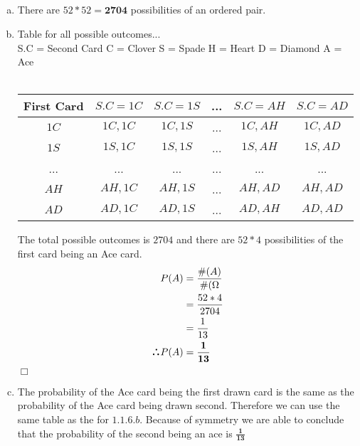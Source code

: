 \documentclass[10pt]{report}
\newenvironment{proof}{\par\noindent{\it Proof.}\hspace*{1em}}{$\Box$\bigskip}
\def\therefore{\boldsymbol{\text{ }
\leavevmode
\lower0.4ex\hbox{$\cdot$}
\kern-.5em\raise0.7ex\hbox{$\cdot$}
\kern-0.6em\lower0.4ex\hbox{$\cdot$}
\thinspace\text{ }}}
\begin{document}
 \subsection{}
 \begin{enumerate}[(a)]
 \item There are $52 * 52 = \mathbf{2704} $ possibilities of an ordered pair. 
 \item \begin{proof}
 \begin{center}
 Table for all possible outcomes... \\
 \footnotesize{ S.C = Second Card }
 \footnotesize{ C = Clover }
 \footnotesize{ S = Spade}
 \footnotesize{ H = Heart}
 \footnotesize{ D = Diamond} 
 \footnotesize{ A = Ace } \\ 
 \ \\
 \begin{tabular}{ |c|c|c|c|c|c| }
 \hline
First Card &  $S.C = 1C$ & $S.C = 1S$ & ... & $S.C = AH$ & $S.C = AD$ \\
\hline
$1C$ & $1C,1C$ & $1C, 1S$ & ... & $1C, AH$ & $1C, AD$  \\
\hline
$1S$ & $1S, 1C $ & $1S,1S$ & ... & $1S, AH$ & $1S, AD $ \\
\hline
... & ... & ... & ... & ... & ... \\
\hline
$AH$ & $AH, 1C$ & $AH, 1S$ & ... & $AH, AD$ & $AH, AD $ \\
\hline
$AD$ & $AD, 1C$ & $AD, 1S$ & ... & $AD, AH$ & $AD,AD $ \\
\hline
 \end{tabular}
 \end{center}
 The total possible outcomes is $2704 $ and there are $52 * 4 $ possibilities of the first card being an Ace card. \\
     \begin{align*}
 P(A) &= \frac{\#(A)}{\#(\Omega} \\
 &= \frac{52*4}{2704} \\
 & = \frac{1}{13} \\
 \therefore  P(A) &= \mathbf{\frac{1}{13}}
 \end{align*} 
 \end{proof}
 \item The probability of the Ace card being the first drawn card is the same as the probability of the Ace card being drawn second. Therefore we can use the same table as the for $1.1.6.b $. Because of symmetry we are able to conclude that the probability of the second being an ace is $\mathbf{\frac{1}{13}} $ \\

\end{enumerate}
\end{document}
